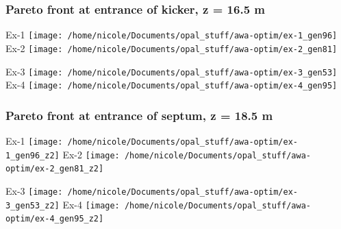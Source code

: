 \documentclass[professionalfonts,t]{beamer}
\begin{document}
\begin{frame}[t]
\frametitle{Pareto front at entrance of kicker, z = 16.5 m}
		\begin{minipage}{0.48\textwidth}
			Ex-1
			\texttt{[image: /home/nicole/Documents/opal\_stuff/awa-optim/ex-1\_gen96]}
			Ex-2	\texttt{[image: /home/nicole/Documents/opal\_stuff/awa-optim/ex-2\_gen81]}
		\end{minipage}
		\begin{minipage}{0.48\textwidth}
			Ex-3
			\texttt{[image: /home/nicole/Documents/opal\_stuff/awa-optim/ex-3\_gen53]}
			Ex-4
			\texttt{[image: /home/nicole/Documents/opal\_stuff/awa-optim/ex-4\_gen95]}
		\end{minipage}

\end{frame}

\begin{frame}[t]
	\frametitle{Pareto front at entrance of septum, z = 18.5 m}
	\begin{minipage}{0.48\textwidth}
		Ex-1
		\texttt{[image: /home/nicole/Documents/opal\_stuff/awa-optim/ex-1\_gen96\_z2]}
		Ex-2
		\texttt{[image: /home/nicole/Documents/opal\_stuff/awa-optim/ex-2\_gen81\_z2]}
	\end{minipage}
	\begin{minipage}{0.48\textwidth}
		Ex-3
		\texttt{[image: /home/nicole/Documents/opal\_stuff/awa-optim/ex-3\_gen53\_z2]}
		Ex-4
		\texttt{[image: /home/nicole/Documents/opal\_stuff/awa-optim/ex-4\_gen95\_z2]}
	\end{minipage}	
\end{frame}

\end{document}

